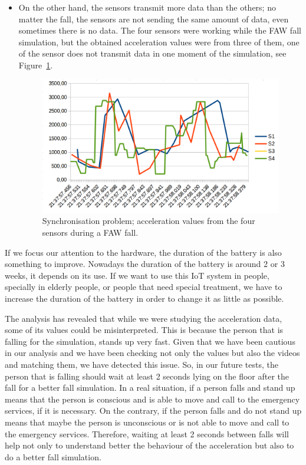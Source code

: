 \documentclass[conference]{IEEEtran}
\theoremstyle{definition}
\begin{document}
\begin{itemize}
 \item On the other hand, the sensors transmit more data than the others; no matter the fall, the sensors are not 
 sending the same amount of data, even sometimes there is no data. The four sensors were working while the FAW fall
 simulation, but the obtained acceleration values were from three of them, one of the sensor does not transmit data 
 in one moment of the simulation, see Figure~\ref{fig:synchronisation2}.
 \begin{figure}[!h]
  \centering
  \includegraphics[scale=0.2]{img/synchronisation2.png}
  \caption[Comparison acceleration during two FAW falls]{Synchronisation problem; acceleration values from the four sensors during a FAW fall.}
  \label{fig:synchronisation2}
 \end{figure}
\end{itemize}

If we focus our attention to the hardware, the duration of the battery is also something to improve. Nowadays the 
duration of the battery is around 2 or 3 weeks, it depends on its use. If we want to use this IoT system in people, 
specially in elderly people, or people that need special treatment, we have to increase the duration of the battery 
in order to change it as little as possible.

The analysis has revealed that while we were studying the acceleration data, some of its values could be misinterpreted.
This is because the person that is falling for the simulation, stands up very fast. Given that we have been cautious
in our analysis and we have been checking not only the values but also the videos and matching them, we have detected
this issue. So, in our future tests, the person that is falling should wait at least 2 seconds lying on the floor 
after the fall for a better fall simulation. In a real situation, if a person falls and stand up means that the person
is conscious and is able to move and call to the emergency services, if it is necessary. On the contrary, if the person
falls and do not stand up means that maybe the person is unconscious or is not able to move and call to the emergency
services. Therefore, waiting at least 2 seconds between falls will help not only to understand better the behaviour of the 
acceleration but also to do a better fall simulation.
\end{document}
